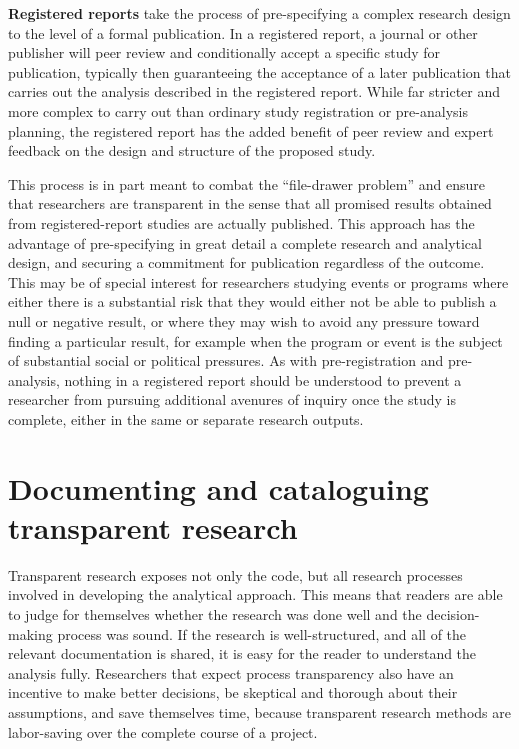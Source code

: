 \textbf{Registered reports}
take the process of pre-specifying a complex research design
to the level of a formal publication.
In a registered report, a journal or other publisher
will peer review and conditionally accept a specific study for publication,
typically then guaranteeing the acceptance of a later publication
that carries out the analysis described in the registered report.
While far stricter and more complex to carry out than
ordinary study registration or pre-analysis planning,
the registered report has the added benefit
of peer review and expert feedback
on the design and structure of the proposed study.

This process is in part meant to combat the ``file-drawer problem''\cite{simonsohn2014p}
and ensure that researchers are transparent in the sense that
all promised results obtained from registered-report studies are actually published.
This approach has the advantage of pre-specifying in great detail
a complete research and analytical design,
and securing a commitment for publication regardless of the outcome.
This may be of special interest for researchers
studying events or programs where either there is a substantial risk
that they would either not be able to publish a null or negative result,
or where they may wish to avoid any pressure toward finding a particular result,
for example when the program or event is the subject of substantial social or political pressures.
As with pre-registration and pre-analysis,
nothing in a registered report should be understood
to prevent a researcher from pursuing additional avenures of inquiry
once the study is complete, either in the same or separate research outputs.

\section{Documenting and cataloguing transparent research}
Transparent research exposes not only the code,
but all research processes involved in developing the analytical approach.
This means that readers are able to judge for themselves whether the research was done well
and the decision-making process was sound.
If the research is well-structured, and all of the relevant documentation
is shared, it is easy for the reader to understand the analysis fully.
Researchers that expect process transparency also have an incentive to make better decisions,
be skeptical and thorough about their assumptions,
and save themselves time,
because transparent research methods are labor-saving over the complete course of a project.

